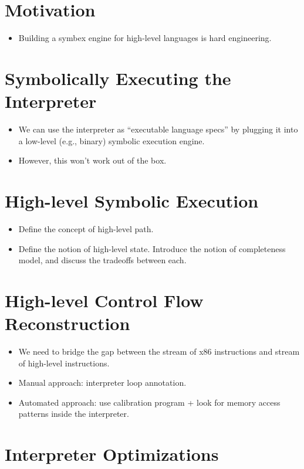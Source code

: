 \section{Motivation}

\begin{itemize}
  \item Building a symbex engine for high-level languages is hard engineering.
\end{itemize}

\section{Symbolically Executing the Interpreter}

\begin{itemize}
\item We can use the interpreter as ``executable language specs'' by plugging it into a low-level (e.g., binary) symbolic execution engine.
\item However, this won't work out of the box.
\end{itemize}

\section{High-level Symbolic Execution}
\begin{itemize}
\item Define the concept of high-level path.
\item Define the notion of high-level state.  Introduce the notion of completeness model, and discuss the tradeoffs between each.
\end{itemize}

\section{High-level Control Flow Reconstruction}
\begin{itemize}
\item We need to bridge the gap between the stream of x86 instructions and stream of high-level instructions.
\item Manual approach: interpreter loop annotation.
\item Automated approach: use calibration program + look for memory access patterns inside the interpreter.
\end{itemize}

\section{Interpreter Optimizations}

